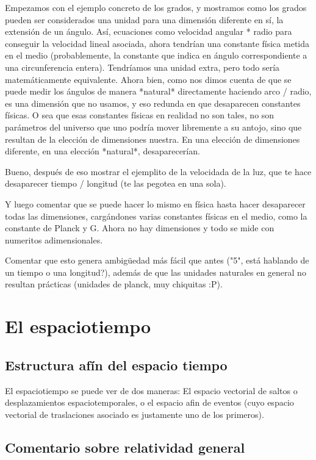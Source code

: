 \documentclass{article}
\begin{document}
Empezamos con el ejemplo concreto de los grados, y mostramos como los grados pueden ser considerados una unidad para una dimensión
diferente en sí, la extensión de un ángulo. Así, ecuaciones como velocidad angular * radio para conseguir la velocidad lineal asociada,
ahora tendrían una constante física metida en el medio (probablemente, la constante que indica en ángulo correspondiente a una circunferencia
entera). Tendríamos una unidad extra, pero todo sería matemáticamente equivalente. Ahora bien, como nos dimos cuenta de que se puede
medir los ángulos de manera *natural* directamente haciendo arco / radio, es una dimensión que no usamos, y eso redunda en que desaparecen
constantes físicas. O sea que esas constantes físicas en realidad no son tales, no son parámetros del universo que uno podría mover
libremente a su antojo, sino que resultan de la elección de dimensiones nuestra. En una elección de dimensiones diferente, en una
elección *natural*, desaparecerían.

Bueno, después de eso mostrar el ejemplito de la velocidada de la luz, que te hace desaparecer tiempo / longitud (te las pegotea en una sola).

Y luego comentar que se puede hacer lo mismo en física hasta hacer desaparecer todas las dimensiones, cargándones varias constantes físicas
en el medio, como la constante de Planck y G. Ahora no hay dimensiones y todo se mide con numeritos adimensionales.

Comentar que esto genera ambigüedad más fácil que antes ("5", está hablando de un tiempo o una longitud?), además de que las unidades
naturales en general no resultan prácticas (unidades de planck, muy chiquitas :P).

\pagebreak

\section{El espaciotiempo}

\subsection{Estructura afín del espacio tiempo}

El espaciotiempo se puede ver de dos maneras: El espacio vectorial de saltos o desplazamientos espaciotemporales, o
el espacio afin de eventos (cuyo espacio vectorial de traslaciones asociado es justamente uno de los primeros).

\subsection{Comentario sobre relatividad general}
\end{document}
